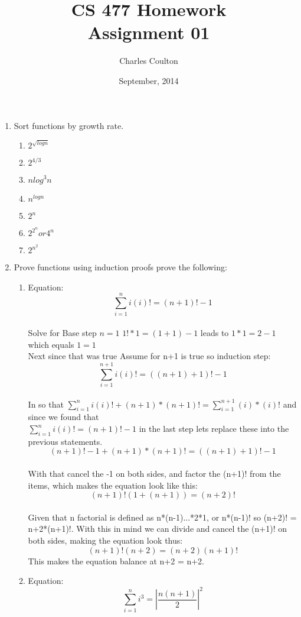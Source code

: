\documentclass[[12pts]{report}
\title{CS 477 Homework \\ Assignment 01}
\date{September, 2014}
\author{Charles Coulton}
\begin{document}
\maketitle

\begin{enumerate}
	\item  
	Sort functions by growth rate.
	\begin{enumerate}
		\item
		$2^{\sqrt{log{n}}}$
		\item
		$2^{4/3}$
		\item
		${n}{{log}^3{n}}$
		\item
		$n^{log{n}}$
		\item
		$2^n$
		\item
		$2^{2^n} or 4^n$
		\item
		${2^{{n}^2}}$
	\end{enumerate}
	\item
	Prove functions using induction proofs prove the following:
	\begin{enumerate}
		\item
		Equation: $$\sum_{i=1}^n i(i)! = (n+1)! -1$$ \\
		Solve for Base step $n =1$
		$1!*1 = (1+1) -1$ leads to  $1*1 = 2 -1$ which equals $1 = 1$\\
		Next since that was true Assume for n+1 is true so induction step:\\
		$$\sum_{i=1}^{n+1} i(i)! = ((n+1)+1)!-1$$ \\
		In so that $\sum_{i=1}^n i(i)! + (n+1)*(n+1)!= \sum_{i=1}^{n+1}(i)*(i)!$ and since we found that\\ 
		$\sum_{i=1}^n i(i)! = (n+1)! -1$ in the last step lets replace these into the previous statements.\\
		$$(n+1)!-1 +(n+1)*(n+1)! = ((n+1)+1)!-1$$ \\
		With that cancel the -1 on both sides, and factor the (n+1)! from the items, which makes the equation look like this: \\
		$$(n+1)!(1+(n+1)) = (n+2)!$$ \\
		Given that n factorial is defined as n*(n-1)...*2*1, or n*(n-1)! so (n+2)! = n+2*(n+1)!.  With this in mind we can divide and cancel the (n+1)! on both sides, making the equation look thus: \\
		$$(n+1)!(n+2) = (n+2)(n+1)!$$
		This makes the equation balance at n+2 = n+2.\\
		\item
		Equation:
		$$\sum_{i=1}^n i^3 = |\frac{n(n+1)}{2}|^2$$

\end{enumerate}
\end{enumerate}
\end{document}
